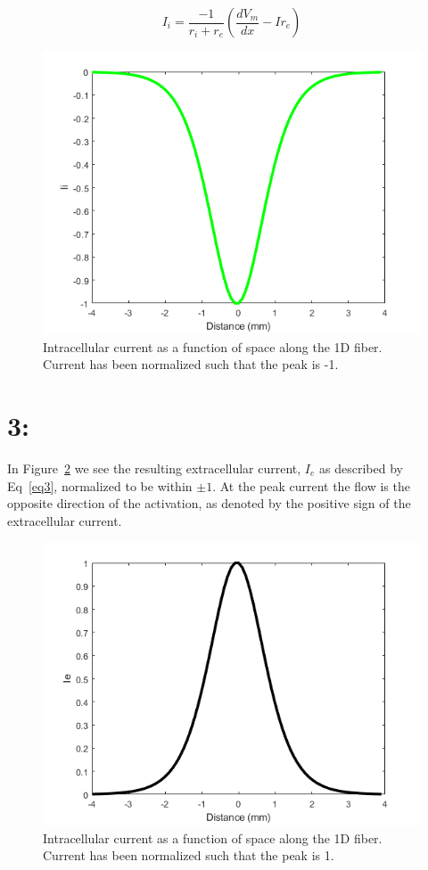 \documentclass[12pt]{article}
\begin{document}
\begin{equation}
I_i = \frac{-1}{r_i + r_e}(\frac{dV_m}{dx} - Ir_e)
\label{eq2}
\end{equation}
\begin{figure}[H]
	
	\centering
	\includegraphics[width=.95\textwidth]{Figures/Ii.png}
	
	\caption{Intracellular current as a function of space along the 1D fiber. Current has been normalized such that the peak is -1.}
	\label{Fig:Ii}
\end{figure}
\section{3: }
In Figure~\ref{Fig:Ie} we see the resulting extracellular current, $I_e$ as described by Eq~\ref{eq3}, normalized to be within $\pm 1$. At the peak current the flow is the opposite direction of the activation, as denoted by the positive sign of the extracellular current.

\begin{figure}[H]
	
	\centering
	\includegraphics[width=.95\textwidth]{Figures/Ie.png}
	
	\caption{Intracellular current as a function of space along the 1D fiber. Current has been normalized such that the peak is 1.}
	\label{Fig:Ie}
\end{figure}
\end{document}
